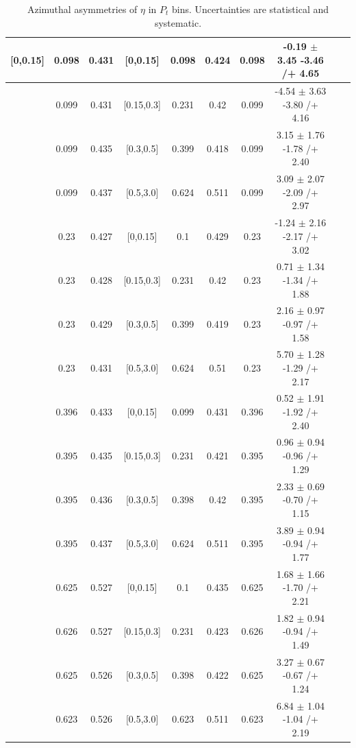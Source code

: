 \begin{table}[H]
\begin{tabular}{|c| c| c| c| c| c| c| c| c| c|}
[0,0.15]	&	0.098	&	0.431	&	[0,0.15]	&	0.098	&	0.424	&	0.098	&	-0.19	$\pm$ 	3.45	-3.46	/+	4.65	\\ \hline
[0,0.15]	&	0.099	&	0.431	&	[0.15,0.3]	&	0.231	&	0.42	        &	0.099	&	-4.54	$\pm$ 	3.63	-3.80	/+	4.16	\\ \hline
[0,0.15]	&	0.099	&	0.435	&	[0.3,0.5]	&	0.399	&	0.418	&	0.099	&	3.15	$\pm$ 	1.76	-1.78	/+	2.40	\\ \hline
[0,0.15]	&	0.099	&	0.437	&	[0.5,3.0]	&	0.624	&	0.511	&	0.099	&	3.09	$\pm$ 	2.07	-2.09	/+	2.97	\\ \hline
[0.15,0.3]	&	0.23	        &	0.427	&	[0,0.15]	&	0.1		&	0.429	&	0.23	        &	-1.24	$\pm$ 	2.16	-2.17	/+	3.02	\\ \hline
[0.15,0.3]	&	0.23	        &	0.428	&	[0.15,0.3]	&	0.231	&	0.42		&	0.23	        &	0.71	$\pm$ 	1.34	-1.34	/+	1.88	\\ \hline
[0.15,0.3]	&	0.23	        	&	0.429	&	[0.3,0.5]	&	0.399	&	0.419	&	0.23	        &	2.16	$\pm$ 	0.97	-0.97	/+	1.58	\\ \hline
[0.15,0.3]	&	0.23		&	0.431	&	[0.5,3.0]	&	0.624	&	0.51	        &	0.23	        &	5.70	$\pm$ 	1.28	-1.29	/+	2.17	\\ \hline
[0.3,0.5]	&	0.396	&	0.433	&	[0,0.15]	&	0.099	&	0.431	&	0.396	&	0.52	$\pm$ 	1.91	-1.92	/+	2.40	\\ \hline
[0.3,0.5]	&	0.395	&	0.435	&	[0.15,0.3]	&	0.231	&	0.421	&	0.395	&	0.96	$\pm$ 	0.94	-0.96	/+	1.29	\\ \hline
[0.3,0.5]	&	0.395	&	0.436	&	[0.3,0.5]	&	0.398	&	0.42	        &	0.395	&	2.33	$\pm$ 	0.69	-0.70	/+	1.15	\\ \hline
[0.3,0.5]	&	0.395	&	0.437	&	[0.5,3.0]	&	0.624	&	0.511	&	0.395	&	3.89	$\pm$ 	0.94	-0.94	/+	1.77	\\ \hline
[0.5,3.0]	&	0.625	&	0.527	&	[0,0.15]	&	0.1	        &	0.435	&	0.625	&	1.68	$\pm$ 	1.66	-1.70	/+	2.21	\\ \hline
[0.5,3.0]	&	0.626	&	0.527	&	[0.15,0.3]	&	0.231	&	0.423	&	0.626	&	1.82	$\pm$ 	0.94	-0.94	/+	1.49	\\ \hline
[0.5,3.0]	&	0.625	&	0.526	&	[0.3,0.5]	&	0.398	&	0.422	&	0.625	&	3.27	$\pm$ 	0.67	-0.67	/+	1.24	\\ \hline
[0.5,3.0]	&	0.623	&	0.526	&	[0.5,3.0]	&	0.623	&	0.511	&	0.623	&	6.84	$\pm$ 	1.04	-1.04	/+	2.19	\\ \hline
\end{tabular}
\caption{Azimuthal asymmetries of $\eta$ in $P_t$ bins. Uncertainties are statistical and systematic.}
\label{tab:finaletaptbin}
\end{table}

